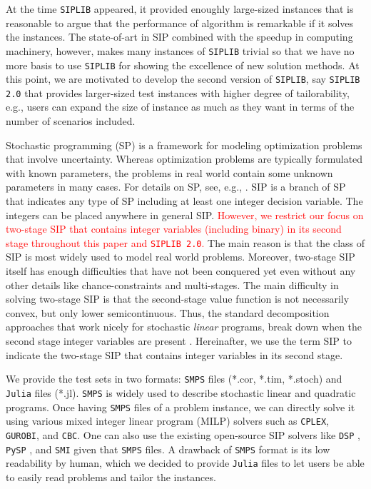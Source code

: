 At the time \texttt{SIPLIB} appeared, it provided enoughly large-sized instances that is reasonable to argue that the performance of algorithm is remarkable if it solves the instances. The state-of-art in SIP combined with the speedup in computing machinery, however, makes many instances of \texttt{SIPLIB} trivial so that we have no more basis to use \texttt{SIPLIB} for showing the excellence of new solution methods. At this point, we are motivated to develop the second version of \texttt{SIPLIB}, say \texttt{SIPLIB 2.0} that provides larger-sized test instances with higher degree of tailorability, e.g., users can expand the size of instance as much as they want in terms of the number of scenarios included.

Stochastic programming (SP) is a framework for modeling optimization problems that involve uncertainty. Whereas optimization problems are typically formulated with known parameters, the problems in real world contain some unknown parameters in many cases. For details on SP, see, e.g., \cite{web:SPS,book:BL2011}. SIP is a branch of SP that indicates any type of SP including at least one integer decision variable. The integers can be placed anywhere in general SIP. \textcolor{red}{However, we restrict our focus on two-stage SIP that contains integer variables (including binary) in its second stage throughout this paper and \texttt{SIPLIB 2.0}.} The main reason is that the class of SIP is most widely used to model real world problems. Moreover, two-stage SIP itself has enough difficulties that have not been conquered yet even without any other details like chance-constraints and multi-stages. The main difficulty in solving two-stage SIP is that the second-stage value function is not necessarily convex, but only lower semicontinuous. Thus, the standard decomposition approaches that work nicely for stochastic \textit{linear} programs, break down when the second stage integer variables are present \cite{journal:AG2004}. Hereinafter, we use the term SIP to indicate the two-stage SIP that contains integer variables in its second stage.

We provide the test sets in two formats: \texttt{SMPS} files (*.cor, *.tim, *.stoch) and \texttt{Julia} files (*.jl). \texttt{SMPS} is widely used to describe stochastic linear and quadratic programs. Once having \texttt{SMPS} files of a problem instance, we can directly solve it using various mixed integer linear program (MILP) solvers such as \texttt{CPLEX}, \texttt{GUROBI}, and \texttt{CBC}. One can also use the existing open-source SIP solvers like \texttt{DSP} \cite{journal:KZ2015}, \texttt{PySP} \cite{journal:WWH2012}, and \texttt{SMI} \cite{web:SMI} given that \texttt{SMPS} files. A drawback of \texttt{SMPS} format is its low readability by human, which we decided to provide \texttt{Julia} files to let users be able to easily read problems and tailor the instances.

